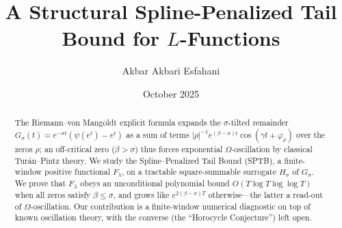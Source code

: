 \documentclass[12pt]{amsart}
\title[A Structural Spline-Penalized Tail Bound]
{A Structural Spline-Penalized Tail Bound for $L$-Functions}
\author{Akbar Akbari Esfahani}
\date{October 2025}
\numberwithin{equation}{section}
\theoremstyle{definition}
\newcommand{\contentbreak}{\clearpage}
\begin{document}
\begin{abstract}
The Riemann--von Mangoldt explicit formula expands the $\sigma$-tilted remainder
$G_\sigma(t)=e^{-\sigma t}(\psi(e^t)-e^t)$ as a sum of terms
$|\rho|^{-1}e^{(\beta-\sigma)t}\cos(\gamma t+\varphi_\rho)$ over the zeros $\rho$;
an off-critical zero ($\beta>\sigma$) thus forces exponential $\Omega$-oscillation
by classical Tur\'an--Pintz theory. We study the Spline--Penalized Tail Bound (SPTB),
a finite-window positive functional $F_\lambda$, on a tractable square-summable
surrogate $H_\sigma$ of $G_\sigma$. We prove that $F_\lambda$ obeys an
unconditional polynomial bound $O(T\log T\log\log T)$ when all zeros satisfy
$\beta\le\sigma$, and grows like $e^{2(\beta-\sigma)T}$ otherwise---the latter a
read-out of $\Omega$-oscillation. Our contribution is a finite-window numerical
diagnostic on top of known oscillation theory, with the converse (the
``Horocycle Conjecture'') left open.
\end{abstract}

\maketitle
\contentbreak

\tableofcontents
\contentbreak










\contentbreak

\appendix





\contentbreak
\end{document}
